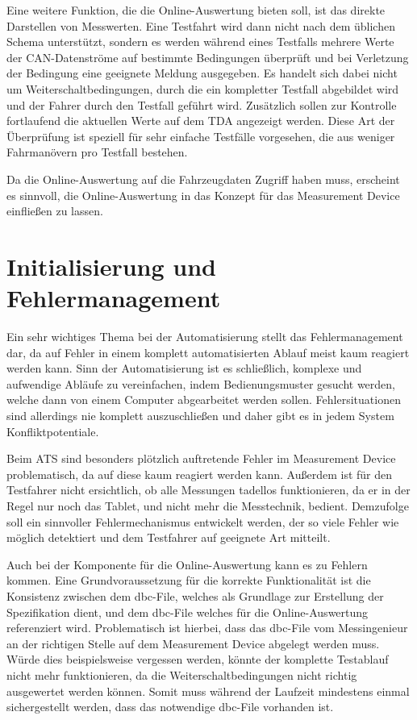 \documentclass[12pt,a4paper]{report}
\begin{document}
Eine weitere Funktion, die die Online-Auswertung bieten soll, ist das direkte Darstellen von Messwerten. Eine Testfahrt wird dann nicht nach dem üblichen Schema unterstützt, sondern es werden während eines Testfalls mehrere Werte der CAN-Datenströme auf bestimmte Bedingungen überprüft und bei Verletzung der Bedingung eine geeignete Meldung ausgegeben. Es handelt sich dabei nicht um Weiterschaltbedingungen, durch die ein kompletter Testfall abgebildet wird und der Fahrer durch den Testfall geführt wird. Zusätzlich sollen zur Kontrolle fortlaufend die aktuellen Werte auf dem TDA angezeigt werden. Diese Art der Überprüfung ist speziell für sehr einfache Testfälle vorgesehen, die aus weniger Fahrmanövern pro Testfall bestehen.

Da die Online-Auswertung auf die Fahrzeugdaten Zugriff haben muss, erscheint es sinnvoll, die Online-Auswertung in das Konzept für das Measurement Device einfließen zu lassen.
\section{Initialisierung und Fehlermanagement}\label{sec:Fehlermanagement}
Ein sehr wichtiges Thema bei der Automatisierung stellt das Fehlermanagement dar, da auf Fehler in einem komplett automatisierten Ablauf meist kaum reagiert werden kann. Sinn der Automatisierung ist es schließlich, komplexe und aufwendige Abläufe zu vereinfachen, indem Bedienungsmuster gesucht werden, welche dann von einem Computer abgearbeitet werden sollen. Fehlersituationen sind allerdings nie komplett auszuschlie\ss en und daher gibt es in jedem System Konfliktpotentiale.

Beim ATS sind besonders plötzlich auftretende Fehler im Measurement Device problematisch, da auf diese kaum reagiert werden kann. Außerdem ist für den Testfahrer nicht ersichtlich, ob alle Messungen tadellos funktionieren, da er in der Regel nur noch das Tablet, und nicht mehr die Messtechnik, bedient. Demzufolge soll ein sinnvoller Fehlermechanismus entwickelt werden, der so viele Fehler wie möglich detektiert und dem Testfahrer auf geeignete Art mitteilt.

Auch bei der Komponente für die Online-Auswertung kann es zu Fehlern kommen. Eine Grundvoraussetzung für die korrekte Funktionalität ist die Konsistenz zwischen dem dbc-File, welches als Grundlage zur Erstellung der Spezifikation dient, und dem dbc-File welches für die Online-Auswertung referenziert wird. Problematisch ist hierbei, dass das dbc-File vom Messingenieur an der richtigen Stelle auf dem Measurement Device abgelegt werden muss. Würde dies beispielsweise vergessen werden, könnte der komplette Testablauf nicht mehr funktionieren, da die Weiterschaltbedingungen nicht richtig ausgewertet werden können. Somit muss während der Laufzeit mindestens einmal sichergestellt werden, dass das notwendige dbc-File vorhanden ist.
\end{document}
